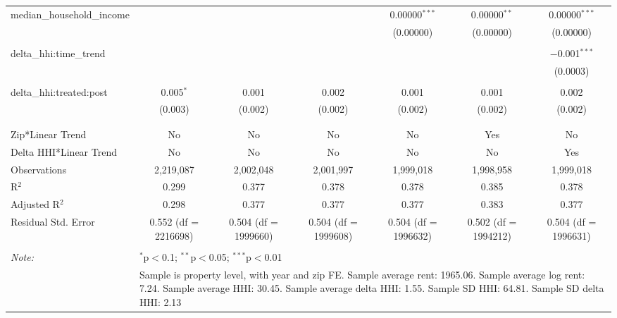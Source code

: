 \begin{table}[H]
{\begin{tabular}{@{\extracolsep{5pt}}lcccccc}
  median\_household\_income &  &  &  & 0.00000$^{***}$ & 0.00000$^{**}$ & 0.00000$^{***}$ \\  

   &  &  &  & (0.00000) & (0.00000) & (0.00000) \\  

   & & & & & & \\  

  delta\_hhi:time\_trend &  &  &  &  &  & $-$0.001$^{***}$ \\  

   &  &  &  &  &  & (0.0003) \\  

   & & & & & & \\  

  delta\_hhi:treated:post & 0.005$^{*}$ & 0.001 & 0.002 & 0.001 & 0.001 & 0.002 \\  

   & (0.003) & (0.002) & (0.002) & (0.002) & (0.002) & (0.002) \\  

   & & & & & & \\  

 \hline \\[-1.8ex]  

 Zip*Linear Trend & No & No & No & No & Yes & No \\  

 Delta HHI*Linear Trend & No & No & No & No & No & Yes \\  

 Observations & 2,219,087 & 2,002,048 & 2,001,997 & 1,999,018 & 1,998,958 & 1,999,018 \\  

 R$^{2}$ & 0.299 & 0.377 & 0.378 & 0.378 & 0.385 & 0.378 \\  

 Adjusted R$^{2}$ & 0.298 & 0.377 & 0.377 & 0.377 & 0.383 & 0.377 \\  

 Residual Std. Error & 0.552 (df = 2216698) & 0.504 (df = 1999660) & 0.504 (df = 1999608) & 0.504 (df = 1996632) & 0.502 (df = 1994212) & 0.504 (df = 1996631) \\  

 \hline  

 \hline \\[-1.8ex]  

 \textit{Note:}  & \multicolumn{6}{l}{$^{*}$p$<$0.1; $^{**}$p$<$0.05; $^{***}$p$<$0.01} \\  

  & \multicolumn{6}{l}{Sample is property level, with year and zip FE. Sample average rent: 1965.06. Sample average log rent: 7.24. Sample average HHI: 30.45. Sample average delta HHI: 1.55. Sample SD HHI: 64.81. Sample SD delta HHI: 2.13} \\  

 \end{tabular}}  

 \end{table}  

